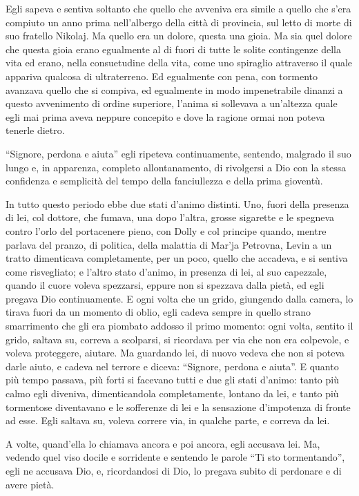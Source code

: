 Egli sapeva e sentiva soltanto che quello che avveniva era simile a quello che s'era compiuto un anno prima nell'albergo della città di provincia, sul letto di morte di suo fratello Nikolaj. Ma quello era un dolore, questa una gioia. Ma sia quel dolore che questa gioia erano egualmente al di fuori di tutte le solite contingenze della vita ed erano, nella consuetudine della vita, come uno spiraglio attraverso il quale appariva qualcosa di ultraterreno. Ed egualmente con pena, con tormento avanzava quello che si compiva, ed egualmente in modo impenetrabile dinanzi a questo avvenimento di ordine superiore, l'anima si sollevava a un'altezza quale egli mai prima aveva neppure concepito e dove la ragione ormai non poteva tenerle dietro. 

``Signore, perdona e aiuta'' egli ripeteva continuamente, sentendo, malgrado il suo lungo e, in apparenza, completo allontanamento, di rivolgersi a Dio con la stessa confidenza e semplicità del tempo della fanciullezza e della prima gioventù. 

In tutto questo periodo ebbe due stati d'animo distinti. Uno, fuori della presenza di lei, col dottore, che fumava, una dopo l'altra, grosse sigarette e le spegneva contro l'orlo del portacenere pieno, con Dolly e col principe quando, mentre parlava del pranzo, di politica, della malattia di Mar'ja Petrovna, Levin a un tratto dimenticava completamente, per un poco, quello che accadeva, e si sentiva come risvegliato; e l'altro stato d'animo, in presenza di lei, al suo capezzale, quando il cuore voleva spezzarsi, eppure non si spezzava dalla pietà, ed egli pregava Dio continuamente. E ogni volta che un grido, giungendo dalla camera, lo tirava fuori da un momento di oblio, egli cadeva sempre in quello strano smarrimento che gli era piombato addosso il primo momento: ogni volta, sentito il grido, saltava su, correva a scolparsi, si ricordava per via che non era colpevole, e voleva proteggere, aiutare. Ma guardando lei, di nuovo vedeva che non si poteva darle aiuto, e cadeva nel terrore e diceva: ``Signore, perdona e aiuta''. E quanto più tempo passava, più forti si facevano tutti e due gli stati d'animo: tanto più calmo egli diveniva, dimenticandola completamente, lontano da lei, e tanto più tormentose diventavano e le sofferenze di lei e la sensazione d'impotenza di fronte ad esse. Egli saltava su, voleva correre via, in qualche parte, e correva da lei. 

A volte, quand'ella lo chiamava ancora e poi ancora, egli accusava lei. Ma, vedendo quel viso docile e sorridente e sentendo le parole ``Ti sto tormentando'', egli ne accusava Dio, e, ricordandosi di Dio, lo pregava subito di perdonare e di avere pietà. 

